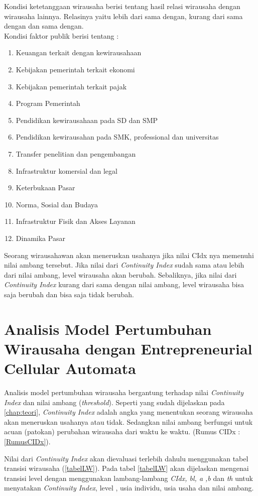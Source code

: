 Kondisi ketetanggaan wirausaha berisi tentang hasil relasi  wirausaha dengan wirausaha lainnya. Relasinya yaitu lebih dari sama dengan, kurang dari sama dengan dan sama dengan.\\
Kondisi faktor publik berisi tentang :
\begin{enumerate}
			\item Keuangan terkait dengan kewirausahaan
			\item Kebijakan pemerintah terkait ekonomi
			\item Kebijakan pemerintah terkait pajak
			\item Program Pemerintah
			\item Pendidikan kewirausahaan pada SD dan SMP
			\item Pendidikan kewirausahan pada SMK, professional dan universitas
			\item Transfer penelitian dan pengembangan
			\item Infrastruktur komersial dan legal
			\item Keterbukaan Pasar
			\item Norma, Sosial dan Budaya
			\item Infrastruktur Fisik dan Akses Layanan
			\item Dinamika Pasar
		 \end{enumerate}

Seorang wirausahawan akan meneruskan usahanya jika nilai CIdx nya memenuhi nilai ambang tersebut. Jika nilai dari \textit{Continuity Index} sudah sama atau lebih dari nilai ambang, level wirausaha akan berubah. Sebaliknya, jika nilai dari \textit{Continuity Index }kurang dari sama dengan nilai ambang, level wirausaha bisa saja berubah dan bisa saja tidak berubah.

\section{Analisis Model Pertumbuhan Wirausaha dengan Entrepreneurial Cellular Automata}
\label{analisismodelCA}

Analisis model pertumbuhan wirausaha bergantung terhadap nilai \textit{Continuity Index} dan nilai ambang (\textit{threshold}). Seperti yang sudah dijelaskan pada \ref{chap:teori}, \textit{Continuity Index} adalah angka yang menentukan seorang wirausaha akan meneruskan usahanya atau tidak. Sedangkan nilai ambang berfungsi untuk acuan (patokan) perubahan wirausaha dari waktu ke waktu. (Rumus CIDx : \ref{RumusCIDx}).


Nilai dari \textit{Continuity Index} akan dievaluasi terlebih dahulu menggunakan tabel transisi wirausaha (\ref{tabelLW}). Pada tabel \ref{tabelLW} akan dijelaskan mengenai transisi level dengan menggunakan lambang-lambang \textit{CIdx, bl, a ,b} dan \textit{th} untuk menyatakan \textit{Continuity Index}, level , usia individu, usia usaha dan nilai ambang.


